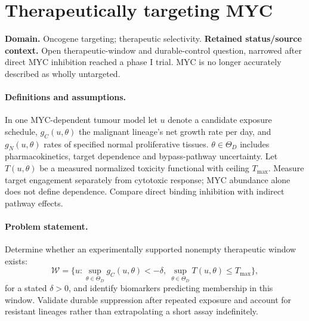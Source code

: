 \documentclass[11pt]{article}
\begin{document}
\section*{Therapeutically targeting MYC}
\label{prob:260}
\label{rank:44}
\par\smallskip

\noindent\textbf{Domain.} Oncogene targeting; therapeutic selectivity. \quad \textbf{Retained status/source context.} Open therapeutic-window and durable-control question, narrowed after direct MYC inhibition reached a phase I trial. MYC is no longer accurately described as wholly untargeted.

\paragraph{Definitions and assumptions.} In one MYC-dependent tumour model let $u$ denote a candidate exposure schedule, $g_C(u,\theta)$ the malignant lineage's net growth rate per day, and $g_N(u,\theta)$ rates of specified normal proliferative tissues. $\theta\in\Theta_D$ includes pharmacokinetics, target dependence and bypass-pathway uncertainty. Let $T(u,\theta)$ be a measured normalized toxicity functional with ceiling $T_{\max}$. Measure target engagement separately from cytotoxic response; MYC abundance alone does not define dependence. Compare direct binding inhibition with indirect pathway effects.

\paragraph{Problem statement.} Determine whether an experimentally supported nonempty therapeutic window exists:
\[
\mathcal W=\{u:\sup_{\theta\in\Theta_D}g_C(u,\theta)<-\delta,
\ \sup_{\theta\in\Theta_D}T(u,\theta)\leq T_{\max}\},
\]
for a stated $\delta>0$, and identify biomarkers predicting membership in this window. Validate durable suppression after repeated exposure and account for resistant lineages rather than extrapolating a short assay indefinitely.
\end{document}
